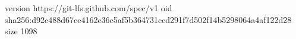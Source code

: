 version https://git-lfs.github.com/spec/v1
oid sha256:d92c488d67ce4162e36c5af5b364731ccd291f7d502f14b5298064a4af122d28
size 1098
